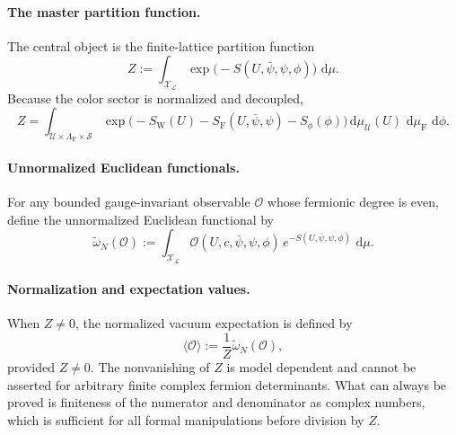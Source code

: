\documentclass[11pt]{article}
\theoremstyle{remark}
\newcommand{\mcU}{\mathscr U}
\newcommand{\mcS}{\mathscr S}
\newcommand{\mcX}{\mathscr X}
\newcommand{\mcO}{\mathcal O}
\newcommand{\dd}{\,\mathrm d}
\begin{document}
\paragraph{The master partition function.}
The central object is the finite-lattice partition function
\begin{equation}
\label{eq:partition-function}
Z
:=
\int_{\mcX_\mathcal L}
\exp\!\bigl(-S(U,\bar\psi,\psi,\phi)\bigr)\,\dd\mu.
\end{equation}
Because the color sector is normalized and decoupled,
\[
Z
=
\int_{\mcU\times\Lambda_{\mathrm F}\times\mcS}
\exp\!\bigl(-S_{\mathrm W}(U)-S_{\mathrm F}(U,\bar\psi,\psi)-S_\phi(\phi)\bigr)
\dd\mu_{\mcU}(U)\,\dd\mu_{\mathrm F}\,\dd\phi.
\]

\paragraph{Unnormalized Euclidean functionals.}
For any bounded gauge-invariant observable $\mcO$ whose fermionic degree is
even, define the unnormalized Euclidean functional by
\begin{equation}
\label{eq:unnormalized-expectation}
\widetilde\omega_N(\mcO)
:=
\int_{\mcX_\mathcal L}
\mcO(U,c,\bar\psi,\psi,\phi)\,
e^{-S(U,\bar\psi,\psi,\phi)}\,\dd\mu.
\end{equation}

\paragraph{Normalization and expectation values.}
When $Z\neq 0$, the normalized vacuum expectation is defined by
\begin{equation}
\label{eq:expectation}
\langle \mcO\rangle
:=
\frac{1}{Z}
\widetilde\omega_N(\mcO),
\end{equation}
provided $Z\neq 0$.  The nonvanishing of $Z$ is model dependent and cannot be
asserted for arbitrary finite complex fermion determinants.  What can always be
proved is finiteness of the numerator and denominator as complex numbers, which
is sufficient for all formal manipulations before division by $Z$.
\end{document}
